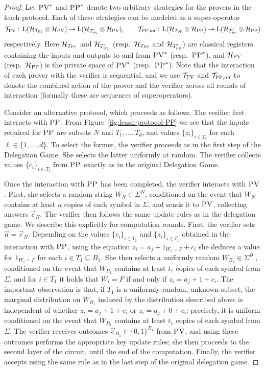 \documentclass[11pt,letter]{article}
\theoremstyle{remark}
\theoremstyle{definition}
\newcommand{\setft}[1]{\mathrm{#1}}
\newcommand{\Lin}{\setft{L}}
\newcommand{\mH}{\mathcal{H}}
\newcommand{\pv}{\textsc{PV}}
\newcommand{\pp}{\textsc{PP}}
\begin{document}
\begin{proof}
Let $\pv^*$ and $\pp^*$ denote two arbitrary strategies for the provers in the leash protocol. Each of these strategies can be modeled as a super-operator 
$$\mathcal{T}_\pv:\, \Lin(\mH_{T_\pv} \otimes \mH_\pv) \to \Lin(\mH_{T'_\pv} \otimes \mH_\pv), \qquad \mathcal{T}_{\pp,ad}: \,\Lin(\mH_{T_\pp} \otimes \mH_\pp) \to \Lin(\mH_{T'_\pp} \otimes \mH_\pp)$$
respectively. Here $\mH_{T_\pv}$ and $\mH_{T'_\pv}$ (resp.\ $\mH_{T_\pp}$ and $\mH_{T'_\pp}$) are classical registers containing the inputs and outputs to and from $\pv^*$ (resp.\ $\pp^*$), and $\mH_\pv$ (resp.\ $\mH_\pp$) is the private space of $\pv^*$ (resp.\ $\pp^*$). Note that the interaction of each prover with the verifier is sequential, and we use $\mathcal{T}_{\pv}$ and $\mathcal{T}_{\pp,ad}$ to denote the combined action of the prover and the verifier across all rounds of interaction (formally these are sequences of superoperators).

Consider an alternative protocol, which proceeds as follows. The verifier first interacts with $\pp$. From Figure~\ref{fig:leash-protocol-PP} we see that the inputs required for $\pp$ are subsets $N$ and $T_1,\ldots,T_d$, and values $\{z_i\}_{i\in T_\ell}$ for each $\ell\in\{1,\ldots,d\}$. To select the former, the verifier proceeds as in the first step of the Delegation Game. She selects the latter uniformly at random. The verifier collects values $\{c_i\}_{i\in T_\ell}$ from $\pp$ exactly as in the original Delegation Game. 

Once the interaction with $\pp$ has been completed, the verifier interacts with $\pv$. First, she selects a random string $W_N\in \Sigma^N$, conditioned on the event that $W_N$ contains at least $n$ copies of each symbol in $\Sigma$, and sends it to $\pv$, collecting answers $\vec{e}_N$. The verifier then follows the same update rules as in the delegation game. We describe this explicitly for computation rounds. First, the verifier sets $\vec{a} = \vec{e}_N$. Depending on the values $\{c_i\}_{i\in T_1}$ and $\{z_i\}_{i\in T_1}$ obtained in the interaction with $\pp$, using the equation $z_i = a_j + 1_{W_i=F}+c_i$ she deduces a value for $1_{W_i=F}$ for each $i\in T_1 \subseteq B_1$. She then selects a uniformly random $W_{B_1} \in \Sigma^{B_1}$, conditioned on the event that $W_{B_1}$ contains at least $t_1$ copies of each symbol from $\Sigma$, and for $i\in T_1$ it holds that $W_i=F$ if and only if $z_i = a_j + 1+c_i$. The important observation is that, if $T_1$ is a uniformly random, unknown subset, the marginal distribution on $W_{B_1}$ induced by the distribution described above is independent of whether $z_i = a_j + 1+c_i$ or $z_i = a_j + 0 +c_i$: precisely, it is uniform conditioned on the event that $W_{B_1}$ contains at least $t_1$ copies of each symbol from $\Sigma$. 
The verifier receives outcomes $\vec{e}_{B_1}\in \{0,1\}^{B_1}$ from $\pv$, and using these outcomes performs the appropriate key update rules; she then proceeds to the second layer of the circuit, until the end of the computation. Finally, the verifier accepts using the same rule as in the last step of the original delegation game. 


\end{proof}
\end{document}
